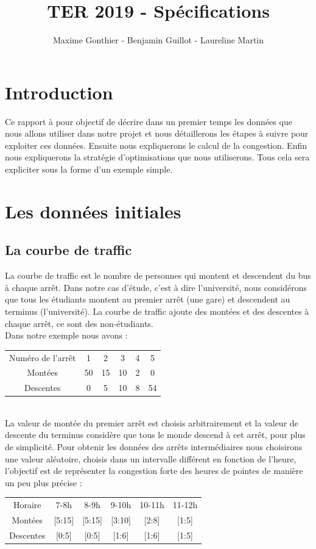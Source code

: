 \documentclass[a4paper,11pt]{article}
\title{TER 2019 - Spécifications}
\author{Maxime Gonthier - Benjamin Guillot - Laureline Martin}
\begin{document}
	\clearpage
	\maketitle

\newpage
\tableofcontents

\newpage
\section{Introduction}
Ce rapport à pour objectif de décrire dans un premier temps les données que nous allons utiliser dans notre projet et nous détaillerons les étapes à suivre pour exploiter ces données. Ensuite nous expliquerons le calcul de la congestion. Enfin nous expliquerons la stratégie d'optimisations que nous utiliserons. Tous cela sera expliciter sous la forme d'un exemple simple.

\section{Les données initiales}
	\subsection{La courbe de traffic}
		La courbe de traffic est le nombre de personnes qui montent et descendent du bus à chaque arrêt. Dans notre cas d'étude, c'est à dire l'université, nous considérons que tous les étudiants montent au premier arrêt (une gare) et descendent au terminus (l'université). La courbe de traffic ajoute des montées et des descentes à chaque arrêt, ce sont des non-étudiants. \\
		Dans notre exemple nous avons : \\
		\begin{tabular}{ | c | c | c | c | c | c |}
 			\hline			
   			Numéro de l'arrêt & 1 & 2 & 3 & 4 & 5\\
   			Montées & 50 & 15 & 10 & 2 & 0 \\
   			Descentes & 0 & 5 & 10 & 8 & 54\\
 			\hline  
 		\end{tabular}\\
 		La valeur de montée du premier arrêt est choisis arbitrairement et la valeur de descente du terminus considère que tous le monde descend à cet arrêt, pour plus de simplicité. 
 		Pour obtenir les données des arrêts intermédiaires nous choisirons une valeur aléatoire, choisis dans un intervalle différent en fonction de l'heure, l'objectif est de représenter la congestion forte des heures de pointes de manière un peu plus précise : \\
 		\begin{tabular}{ | c | c | c | c | c | c |}
 			\hline			
   			Horaire & 7-8h & 8-9h & 9-10h & 10-11h & 11-12h\\
   			Montées & [5:15] & [5:15] & [3:10] & [2:8] & [1:5] \\
   			Descentes & [0:5] & [0:5] & [1:6] & [1:6] & [1:5]\\
 			\hline  
 		\end{tabular}\\
\end{document}
